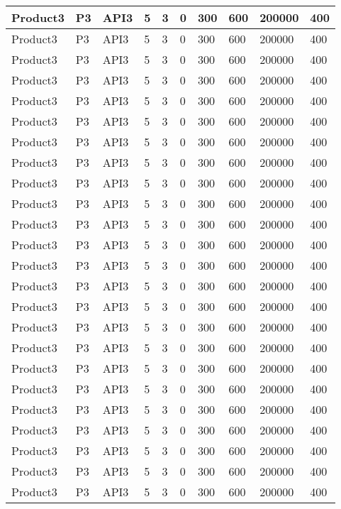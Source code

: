\documentclass{article}
\begin{document}
\begin{longtable}[l]{|p{1.5cm}|p{1.7cm}|p{1cm}|p{1.5cm}|p{1.7cm}|p{1cm}|p{1cm}|p{1cm}|p{1cm}|p{1.5cm}|}
\hline
Product3 & P3 & API3 & 5 & 3 & 0 & 300 & 600 & 200000 & 400\\
\hline
Product3 & P3 & API3 & 5 & 3 & 0 & 300 & 600 & 200000 & 400\\
\hline
Product3 & P3 & API3 & 5 & 3 & 0 & 300 & 600 & 200000 & 400\\
\hline
Product3 & P3 & API3 & 5 & 3 & 0 & 300 & 600 & 200000 & 400\\
\hline
Product3 & P3 & API3 & 5 & 3 & 0 & 300 & 600 & 200000 & 400\\
\hline
Product3 & P3 & API3 & 5 & 3 & 0 & 300 & 600 & 200000 & 400\\
\hline
Product3 & P3 & API3 & 5 & 3 & 0 & 300 & 600 & 200000 & 400\\
\hline
Product3 & P3 & API3 & 5 & 3 & 0 & 300 & 600 & 200000 & 400\\
\hline
Product3 & P3 & API3 & 5 & 3 & 0 & 300 & 600 & 200000 & 400\\
\hline
Product3 & P3 & API3 & 5 & 3 & 0 & 300 & 600 & 200000 & 400\\
\hline
Product3 & P3 & API3 & 5 & 3 & 0 & 300 & 600 & 200000 & 400\\
\hline
Product3 & P3 & API3 & 5 & 3 & 0 & 300 & 600 & 200000 & 400\\
\hline
Product3 & P3 & API3 & 5 & 3 & 0 & 300 & 600 & 200000 & 400\\
\hline
Product3 & P3 & API3 & 5 & 3 & 0 & 300 & 600 & 200000 & 400\\
\hline
Product3 & P3 & API3 & 5 & 3 & 0 & 300 & 600 & 200000 & 400\\
\hline
Product3 & P3 & API3 & 5 & 3 & 0 & 300 & 600 & 200000 & 400\\
\hline
Product3 & P3 & API3 & 5 & 3 & 0 & 300 & 600 & 200000 & 400\\
\hline
Product3 & P3 & API3 & 5 & 3 & 0 & 300 & 600 & 200000 & 400\\
\hline
Product3 & P3 & API3 & 5 & 3 & 0 & 300 & 600 & 200000 & 400\\
\hline
Product3 & P3 & API3 & 5 & 3 & 0 & 300 & 600 & 200000 & 400\\
\hline
Product3 & P3 & API3 & 5 & 3 & 0 & 300 & 600 & 200000 & 400\\
\hline
Product3 & P3 & API3 & 5 & 3 & 0 & 300 & 600 & 200000 & 400\\
\hline
Product3 & P3 & API3 & 5 & 3 & 0 & 300 & 600 & 200000 & 400\\
\hline
Product3 & P3 & API3 & 5 & 3 & 0 & 300 & 600 & 200000 & 400\\

\end{longtable}
\end{document}
